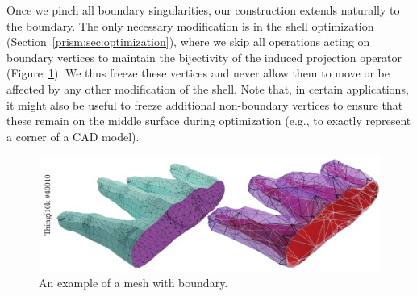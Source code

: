 Once we pinch all boundary singularities, our construction extends naturally to the boundary. The only necessary modification is in the shell optimization (Section~\ref{prism:sec:optimization}), where we skip all operations acting on boundary vertices to maintain the bijectivity of the induced projection operator (Figure~\ref{prism:fig:open-hand}).
%
We thus freeze these vertices and never allow them to move or be affected by any other modification of the shell. Note that, in certain applications, it might also be useful to freeze additional non-boundary vertices to ensure that these remain on the middle surface during optimization (e.g., to exactly represent a corner of a CAD model).


\begin{figure}
    \centering
    \includegraphics[width=0.9\linewidth]{prism-tex/figs/open-hand}
    \caption{An example of a mesh with boundary.}
    \label{prism:fig:open-hand}
    
\end{figure}











